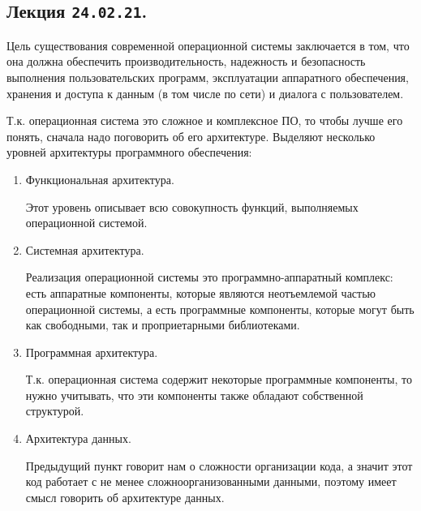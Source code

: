 \subsection{%
  Лекция \texttt{24.02.21}.%
}

Цель существования современной операционной системы заключается в том, что она
должна обеспечить производительность, надежность и безопасность выполнения
пользовательских программ, эксплуатации аппаратного обеспечения, хранения и
доступа к данным (в том числе по сети) и диалога с пользователем.

Т.к. операционная система это сложное и комплексное ПО, то чтобы лучше его
понять, сначала надо поговорить об его архитектуре. Выделяют несколько уровней
архитектуры программного обеспечения:

\begin{enumerate}
\item
  Функциональная архитектура.
  
  Этот уровень описывает всю совокупность функций, выполняемых операционной
  системой.

\item
  Системная архитектура.

  Реализация операционной системы это программно-аппаратный комплекс: есть
  аппаратные компоненты, которые являются неотъемлемой частью операционной
  системы, а есть программные компоненты, которые могут быть как свободными, так
  и проприетарными библиотеками. 

\item
  Программная архитектура.

  Т.к. операционная система содержит некоторые программные компоненты, то нужно
  учитывать, что эти компоненты также обладают собственной структурой.

\item
  Архитектура данных.

  Предыдущий пункт говорит нам о сложности организации кода, а значит этот код
  работает с не менее сложноорганизованными данными, поэтому имеет смысл
  говорить об архитектуре данных.
\end{enumerate}


